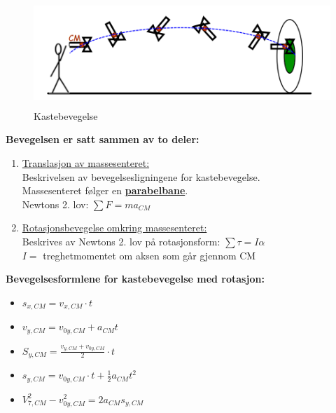 \documentclass[12pt]{article}
\begin{document}
\begin{figure} [H]
    \centering
    \includegraphics[height = 4cm]{images/throw.png}
    \caption{Kastebevegelse}
\end{figure}
\textbf{Bevegelsen er satt sammen av to deler:}
\begin{enumerate}
    \item \underline{Translasjon av massesenteret:}\\
    Beskrivelsen av bevegelsesligningene for kastebevegelse.\\
    Massesenteret følger en \underline{\textbf{parabelbane}}.\\
    Newtons 2. lov: $\sum F = ma_{CM}$

    \item \underline{Rotasjonsbevegelse omkring massesenteret:}\\
    Beskrives av Newtons 2. lov på rotasjonsform: $\sum \tau = I\alpha$\\
    $I =$ treghetmomentet om aksen som går gjennom CM
\end{enumerate}
\textbf{Bevegelsesformlene for kastebevegelse med rotasjon:}
\begin{itemize}
    \item[] $s_{x,CM} = v_{x,CM}\cdot t$
    \item[] $v_{y,CM} = v_{0y,CM} + a_{CM}t$
    \item[] $S_{y,CM} = \frac{v_{y,CM}+v_{0y,CM}}{2}\cdot t$
    \item[] $s_{y,CM} = v_{0y,CM}\cdot t + \frac{1}{2}a_{CM}t^2$
    \item[] $V^2_{7,CM} - v^2_{0y,CM} = 2a_{CM}s_{y,CM}$
\end{itemize}
\end{document}
